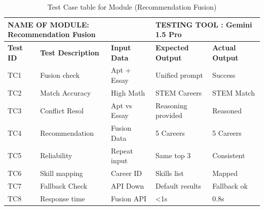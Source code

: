 \begin{table}[htbp]
\begin{center}
\caption{Test Case table for Module (Recommendation Fusion)}
 \begin{tabular}{| m{1cm} | m{4cm} | m{2 cm}| m{3cm}|m{3cm}| } 
\hline
\multicolumn{3}{|l|}{NAME OF MODULE: Recommendation Fusion}&
\multicolumn{2}{|l|}{TESTING TOOL : Gemini 1.5 Pro}\\[0.8cm]
\hline
\textbf{Test ID} &\textbf{Test Description} & \textbf{Input Data} & \textbf{Expected Output} & \textbf{Actual Output} \\ 
\hline
TC1 & Fusion check & Apt + Essay & Unified prompt & Success \\[1.25cm]
\hline
TC2 & Match Accuracy & High Math & STEM Careers & STEM Match \\[1.25cm]
\hline
TC3 & Conflict Resol & Apt vs Essay & Reasoning provided & Reasoned \\[1.25cm]
\hline
TC4 & Recommendation & Fusion Data & 5 Careers & 5 Careers \\[1.25cm]
\hline
TC5 & Reliability & Repeat input & Same top 3 & Consistent \\[1.25cm]
\hline
TC6 & Skill mapping & Career ID & Skills list & Mapped \\[1.25cm]
\hline
TC7 & Fallback Check & API Down & Default results & Fallback ok \\[1.25cm]
\hline
TC8 & Response time & Fusion API & <1s & 0.8s \\[1.25cm]
\hline
\end{tabular}

\end{center}
\end{table}
\clearpage
